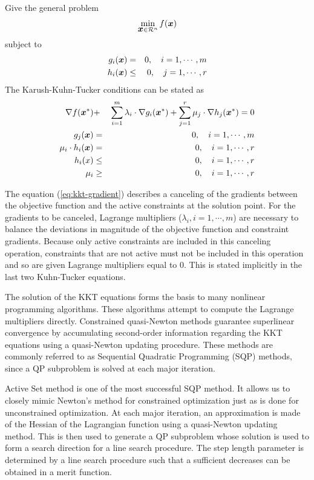 \documentclass[journal,comsoc]{IEEEtran}
\begin{document}
Give the general problem
\begin{equation}
    \min_{\mbox{\boldmath $x$} \in \mathcal{R}^n} f(\mbox{\boldmath $x$}) \label{gp}
\end{equation}
subject to
\begin{eqnarray*}
    g_i(\mbox{\boldmath $x$}) & = & 0, \quad i = 1, \cdots , m\\
    h_i(\mbox{\boldmath $x$}) & \leq & 0, \quad j = 1,\cdots , r
\end{eqnarray*}
The Karush-Kuhn-Tucker conditions can be stated as
\begin{eqnarray}
  \nabla f(\mbox{\boldmath $x$}^*) & + & \sum_{i=1}^m \lambda_i \cdot \nabla g_i(\mbox{\boldmath $x$}^*) + \sum_{j=1}^r \mu_j \cdot \nabla h_j(\mbox{\boldmath $x$}^*) =  0  \label{eq:kkt-gradient}\\
  g_j(\mbox{\boldmath $x$}) & = & 0,  \quad i = 1, \cdots, m \nonumber\\
  \mu_i \cdot h_i(\mbox{\boldmath $x$}) & = & 0, \quad i = 1, \cdots , r \nonumber\\
  h_i(x) & \leq & 0, \quad i = 1, \cdots, r \nonumber\\
  \mu_i &\geq & 0, \quad i = 1,\cdots, r\nonumber
\end{eqnarray}

The equation (\ref{eq:kkt-gradient}) describes a canceling of the gradients between the objective function and the active constraints at the solution point. For the gradients to be canceled, Lagrange multipliers ($\lambda_i, i = 1,\cdots,m$) are necessary to balance the deviations in magnitude of the objective function and constraint gradients. Because only active constraints are included in this canceling operation, constraints that are not active must not be included in this operation and so are given Lagrange multipliers equal to 0. This is stated implicitly in the last two Kuhn-Tucker equations.

The solution of the KKT equations forms the basis to many nonlinear programming algorithms. These algorithms attempt to compute the Lagrange multipliers directly. Constrained quasi-Newton methods guarantee superlinear convergence by accumulating second-order information regarding the KKT equations using a quasi-Newton updating procedure. These methods are commonly referred to as Sequential Quadratic Programming (SQP) methods, since a QP subproblem is solved at each major iteration.

 Active Set method is one of the most successful SQP method. It allows us to closely mimic Newton's method for constrained optimization just as is done for unconstrained optimization. At each major iteration, an approximation is made of the Hessian of the Lagrangian function using a quasi-Newton updating method. This is then used to generate a QP subproblem whose solution is used to form a search direction for a line search procedure. The step length parameter is determined by a line search procedure such that a sufficient decreases can be obtained in a merit function. 
 
\end{document}
